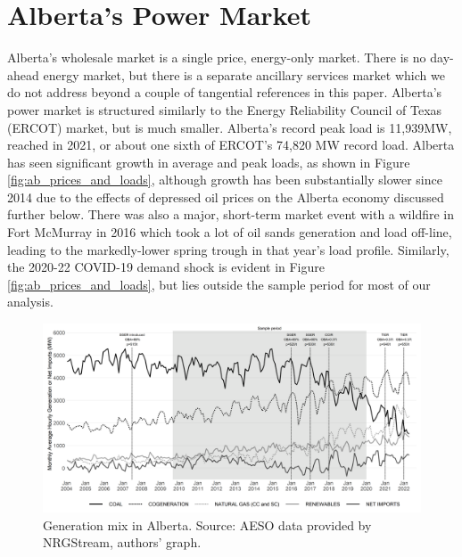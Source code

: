 \documentclass[12pt]{article}
\begin{document}
\section{Alberta's Power Market}\label{sec:market}

Alberta's wholesale market is a single price, energy-only market. There is no day-ahead energy market, but there is a separate ancillary services market which we do not address beyond a couple of tangential references in this paper. Alberta's power market is structured similarly to the Energy Reliability Council of Texas (ERCOT) market, but is much smaller. Alberta's record peak load is 11,939MW, reached in 2021, or about one sixth of ERCOT's 74,820 MW record load. Alberta has seen significant growth in average and peak loads, as shown in Figure \ref{fig:ab_prices_and_loads}, although growth has been substantially slower since 2014 due to the effects of depressed oil prices on the Alberta economy discussed further below. There was also a major, short-term market event with a wildfire in Fort McMurray in 2016 which took a lot of oil sands generation and load off-line, leading to the markedly-lower spring trough in that year's load profile. Similarly, the 2020-22 COVID-19 demand shock is evident in Figure \ref{fig:ab_prices_and_loads}, but lies outside the sample period for most of our analysis.

\begin{figure}[th]%
	\centering \vspace{-.25cm} \includegraphics[width=6.5in]{../images/gen_fuel_policies.png}
\vspace{-0.75cm}	\caption{Generation mix in Alberta.  Source: AESO data provided by NRGStream, authors' graph.}
\label{fig:gen_mix}
\end{figure}
\end{document}
